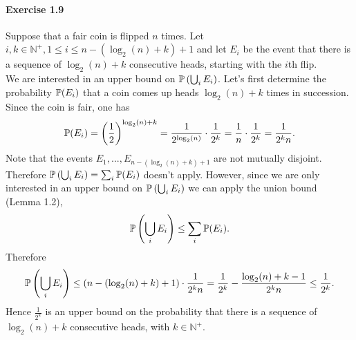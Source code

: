 \paragraph{Exercise 1.9} Suppose that a fair coin is flipped $n$ times. Let $i, k \in
\mathbb{N}^+, 1 \leq i \leq n - \left(\log_2(n) + k \right) + 1$ and let $E_i$ be the
event that there is a sequence of $\log_2(n) + k$ consecutive heads, starting with
the $i$th flip. \\
We are interested in an upper bound on $\mathbb{P}\left(\bigcup_i E_i\right)$. Let's first
determine the probability $\mathbb{P}(E_i)$ that a coin comes up heads $\log_2(n) + k$
times in succession. Since the coin is fair, one has
\[ \mathbb{P}(E_i)
  = \left(\frac{1}{2}\right)^{\log_2(n) + k}
  = \frac{1}{2^{\log_2(n)}} \cdot \frac{1}{2^k}
  = \frac{1}{n} \cdot \frac{1}{2^k}
  = \frac{1}{2^k n}.
\]
Note that the events $E_1,...,E_{n - \left(\log_2(n) + k \right) + 1}$ are not
mutually disjoint. Therefore $\mathbb{P}\left(\bigcup_i E_i\right) = \sum_i \mathbb{P}(E_i)$
doesn't apply. However, since we are only interested in an upper bound on
$\mathbb{P}\left(\bigcup_i E_i\right)$ we can apply the union bound (Lemma 1.2),
\[ \mathbb{P}\left(\bigcup_i E_i\right) \leq \sum_i \mathbb{P}(E_i). \]
Therefore
\[ \mathbb{P}\left(\bigcup_i E_i\right)
  \leq \left(n - \left(\log_2(n) + k \right) + 1\right) \cdot \frac{1}{2^k n}
  = \frac{1}{2^k} - \frac{\log_2(n) + k - 1}{2^k n}
  \leq \frac{1}{2^k}.
\]
Hence $\frac{1}{2^k}$ is an upper bound on the probability that there is a
sequence of $\log_2(n) + k$ consecutive heads, with $k \in \mathbb{N}^+$.
